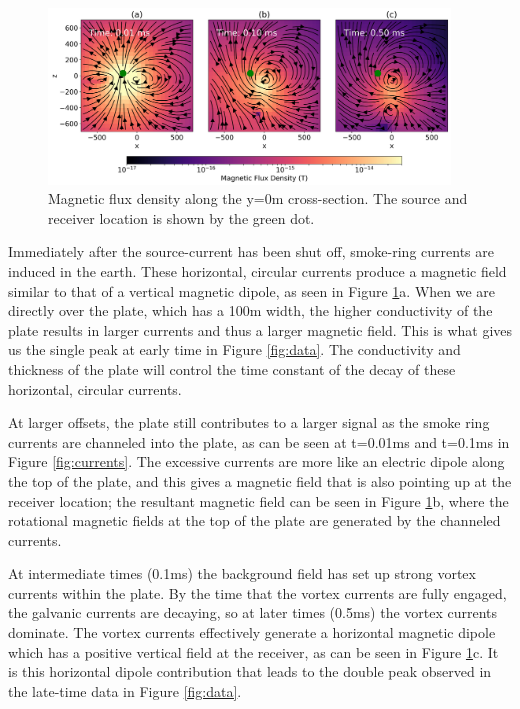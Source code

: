 \documentclass[paper]{geophysics}
\begin{document}
\begin{figure}[!htb]
  \centering
  \includegraphics[width=0.95\textwidth]{figures/magnetic_flux.png}
  \caption{Magnetic flux density along the y=0m cross-section. The source and receiver location is shown by the green dot.}
  \label{fig:magnetic_flux}
\end{figure}


Immediately after the source-current has been shut off, smoke-ring currents are induced in the earth. These horizontal, circular currents produce a magnetic field similar to that of a vertical magnetic dipole, as seen in Figure \ref{fig:magnetic_flux}a. When we are directly over the plate, which has a 100m width, the higher conductivity of the plate results in larger currents and thus a larger magnetic field. This is what gives us the single peak at early time in Figure \ref{fig:data}. The conductivity and thickness of the plate will control the time constant of the decay of these horizontal, circular currents.

At larger offsets, the plate still contributes to a larger signal as the smoke ring currents are channeled into the plate, as can be seen at t=0.01ms and t=0.1ms in Figure \ref{fig:currents}. The excessive currents are more like an electric dipole along the top of the plate, and this gives a magnetic field that is also pointing up at the receiver location; the resultant magnetic field can be seen in Figure \ref{fig:magnetic_flux}b, where the rotational magnetic fields at the top of the plate are generated by the channeled currents.

At intermediate times (0.1ms) the background field has set up strong vortex currents within the plate. By the time that the vortex currents are fully engaged, the galvanic currents are decaying, so at later times (0.5ms) the vortex currents dominate. The vortex currents effectively generate a horizontal magnetic dipole which has a positive vertical field at the receiver, as can be seen in Figure \ref{fig:magnetic_flux}c. It is this horizontal dipole contribution that leads to the double peak observed in the late-time data in Figure \ref{fig:data}.
\end{document}
